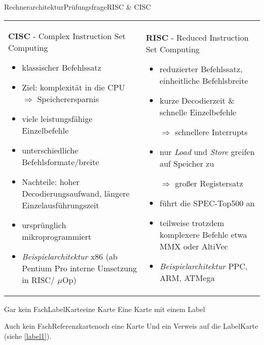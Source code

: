 %
%


	
	\begin{karte}{Rechnerarchitektur}{Prüfungsfrage}{RISC \& CISC}
			\begin{tabular}{p{}|p{}}
				\parbox[t]{.45\textwidth}
				{\textbf{CISC} - Complex Instruction Set Computing\\
				\begin{itemize}
					\item klassischer Befehlssatz
					\item Ziel: komplexität in die CPU $\Rightarrow$ Speicherersparnis
					\item viele leistungsfähige Einzelbefehle
					\item unterschiedliche Befehlsformate/breite
					\item Nachteile: hoher Decodierungsaufwand, längere Einzelausführungszeit
					\item ursprünglich mikroprogrammiert
					\item \emph{Beispielarchitektur} x86\\
					(ab Pentium Pro interne Umsetzung in RISC/ $\mu$Op)
				\end{itemize}}
				&
				\parbox[t]{.45\textwidth}
				{\textbf{RISC} - Reduced Instruction Set Computing\\
				\begin{itemize}
					\item reduzierter Befehlssatz, einheitliche Befehlsbreite
					\item kurze Decodierzeit \& schnelle Einzelbefehle
					\item[$\Rightarrow$] schnellere Interrupts 
					\item nur \emph{Load} und \emph{Store} greifen auf Speicher zu
					\item[$\Rightarrow$] großer Registersatz 
					\item führt die SPEC-Top500 an
					\item teilweise trotzdem komplexere Befehle etwa MMX oder AltiVec
					\item \emph{Beispielarchitektur} PPC, ARM, ATMega
				\end{itemize}
				}
			\end{tabular}
	\end{karte}

	\begin{karte}{Gar kein Fach}{LabelKarte}{eine Karte}
		Eine Karte mit einem Label \label{label1}
	\end{karte}

	\begin{karte}{Auch kein Fach}{Referenzkarte}{noch eine Karte}
		Und ein Verweis auf die LabelKarte (siehe \ref{label1}).
	\end{karte}

